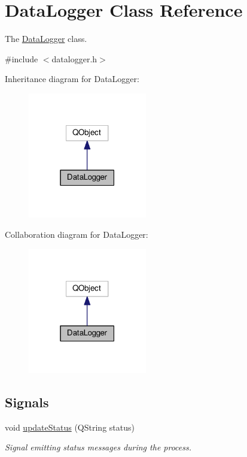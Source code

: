 \hypertarget{classDataLogger}{}\section{Data\+Logger Class Reference}
\label{classDataLogger}


The \hyperlink{classDataLogger}{Data\+Logger} class.  




{\ttfamily \#include $<$datalogger.\+h$>$}



Inheritance diagram for Data\+Logger\+:
\nopagebreak
\begin{figure}[H]
\begin{center}
\leavevmode
\includegraphics[width=147pt]{classDataLogger__inherit__graph}
\end{center}
\end{figure}


Collaboration diagram for Data\+Logger\+:
\nopagebreak
\begin{figure}[H]
\begin{center}
\leavevmode
\includegraphics[width=147pt]{classDataLogger__coll__graph}
\end{center}
\end{figure}
\subsection*{Signals}
\begin{DoxyCompactItemize}
\item 
void \hyperlink{classDataLogger_a59e42d6e77f7fd97ea23529abb6c275c}{update\+Status} (Q\+String status)
\begin{DoxyCompactList}\small\item\em Signal emitting status messages during the process. \end{DoxyCompactList}\end{DoxyCompactItemize}
